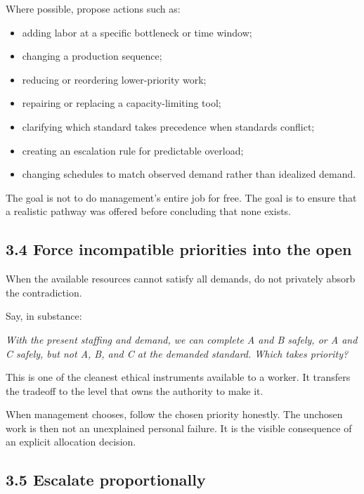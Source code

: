\documentclass[11pt,oneside]{article}
\providecommand{\tightlist}{%
  \setlength{\itemsep}{0.22em}\setlength{\parskip}{0pt}}
\renewenvironment{quote}
  {\begin{tcolorbox}[
      enhanced,
      breakable,
      colback=ManifestLight,
      colframe=ManifestRule,
      boxrule=0pt,
      leftrule=3pt,
      arc=0pt,
      outer arc=0pt,
      left=10pt,right=10pt,top=8pt,bottom=8pt,
      before skip=0.8em,after skip=0.8em
    ]\itshape}
  {\end{tcolorbox}}
\begin{document}
Where possible, propose actions such as:

\begin{itemize}
\tightlist
\item
  adding labor at a specific bottleneck or time window;
\item
  changing a production sequence;
\item
  reducing or reordering lower-priority work;
\item
  repairing or replacing a capacity-limiting tool;
\item
  clarifying which standard takes precedence when standards conflict;
\item
  creating an escalation rule for predictable overload;
\item
  changing schedules to match observed demand rather than idealized
  demand.
\end{itemize}

The goal is not to do management's entire job for free. The goal is to
ensure that a realistic pathway was offered before concluding that none
exists.

\subsection{3.4 Force incompatible priorities into the
open}\label{force-incompatible-priorities-into-the-open}

When the available resources cannot satisfy all demands, do not
privately absorb the contradiction.

Say, in substance:

\begin{quote}
With the present staffing and demand, we can complete A and B safely, or
A and C safely, but not A, B, and C at the demanded standard. Which
takes priority?
\end{quote}

This is one of the cleanest ethical instruments available to a worker.
It transfers the tradeoff to the level that owns the authority to make
it.

When management chooses, follow the chosen priority honestly. The
unchosen work is then not an unexplained personal failure. It is the
visible consequence of an explicit allocation decision.

\subsection{3.5 Escalate proportionally}\label{escalate-proportionally}
\end{document}
